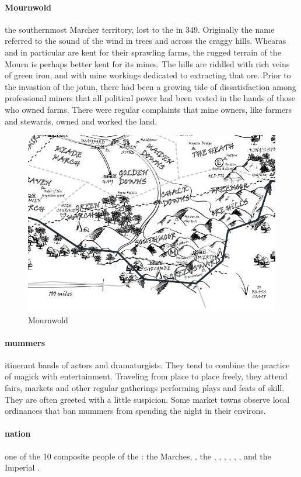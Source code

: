 \paragraph{Mournwold} the southernmost Marcher territory, lost to the  in 349. Originally the name referred to the sound of the wind in trees and across the craggy hills. Whearas  and  in particular are kent for their sprawling farms, the rugged terrain of the Mourn is perhaps better kent for its mines. The hills are riddled with rich veins of green iron, and with mine workings dedicated to extracting that ore. Prior to the invastion of the jotun, there had been a growing tide of dissatisfaction among professional miners that all political power had been vested in the hands of those who owned farms. There were regular complaints that mine owners, like farmers and stewards, owned and worked the land.\begin{figure}\centering\includegraphics[width=19.5cm,angle=90]{atlasofthemarches/Mournwold}\caption{Mournwold}\end{figure}
\paragraph{mummers} itinerant bands of actors and dramaturgists. They tend to combine the practice of  magick with entertainment. Traveling from place to place freely, they attend fairs, markets and other regular gatherings performing plays and feats of skill. They are often greeted with a little suspicion. Some market towns observe local ordinances that ban mummers from spending the night in their environs.
\paragraph{nation} one of the 10 composite people of the : the Marches, , the , , , , , ,  and the Im\-pe\-ri\-al .
